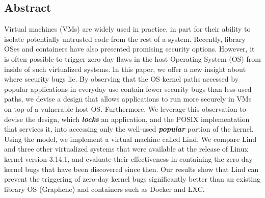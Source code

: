 \subsection*{Abstract}

Virtual machines (VMs) are widely used in practice, in part for their ability to
isolate potentially untrusted code from the rest of a system.
Recently, library OSes and containers have also presented promising security options.
%
However, it is often possible to trigger zero-day flaws
in the host Operating System (OS) from inside of such virtualized systems.
%
In this paper, we offer a new insight about where security bugs lie. By observing that the OS kernel paths accessed
by popular applications in everyday use contain fewer security bugs than less-used paths, 
we devise a design that allows applications to run more securely in VMs on top of a vulnerable host OS.
Furthermore, We
leverage this observation to devise the \lip design, which
\textbf{\textit{locks}} an application, and the POSIX implementation that services it, into
accessing only the well-used \textbf{\textit{popular}} portion of the kernel.  Using the \lip model, we
implement a virtual machine called Lind.
%
We compare Lind and three other virtualized systems that were
available at the release of Linux kernel version 3.14.1, and evaluate
their effectiveness in containing the zero-day kernel bugs that have been discovered
since then.
%
Our results show that Lind can prevent the triggering of zero-day kernel bugs significantly better
than an existing library OS (Graphene) and containers such as Docker and LXC.